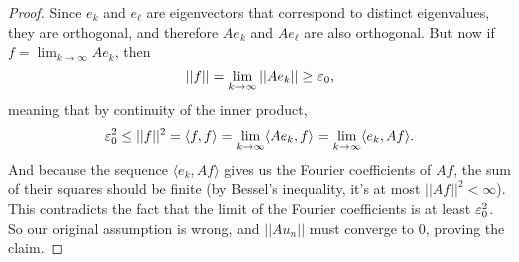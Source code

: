 \begin{proof}
Since $e_k$ and $e_\ell$ are eigenvectors that correspond to distinct eigenvalues, they are orthogonal, and therefore $Ae_k$ and $Ae_\ell$ are also orthogonal. But now if $f = \lim_{k \to \infty} Ae_k$, then 
\[
    ||f|| = \lim_{k \to \infty} ||Ae_k|| \ge \varepsilon_0,
\]
meaning that by continuity of the inner product,
\[
    \varepsilon_0^2 \le ||f||^2 = \langle f, f \rangle = \lim_{k \to \infty} \langle Ae_k, f \rangle = \lim_{k \to \infty} \langle e_k, Af \rangle.
\]
And because the sequence $\langle e_k, Af \rangle$ gives us the Fourier coefficients of $Af$, the sum of their squares should be finite (by Bessel's inequality, it's at most $||Af||^2 < \infty$). This contradicts the fact that the limit of the Fourier coefficients is at least $\varepsilon_0^2$. So our original assumption is wrong, and $||Au_n||$ must converge to $0$, proving the claim.
\end{proof}